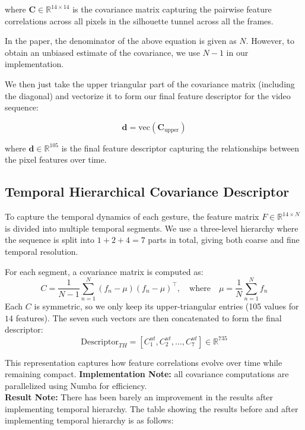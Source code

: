 where $\mathbf{C} \in \mathbb{R}^{14 \times 14}$ is the covariance matrix capturing the pairwise feature correlations across all pixels in the silhouette tunnel across all the frames.



 In the paper, the denominator of the above equation is given as $N$. However, to obtain an unbiased estimate of the covariance, we use $N-1$ in our implementation.

We then just take the upper triangular part of the covariance matrix (including the diagonal) and vectorize it to form our final feature descriptor for the video sequence:

\[
\mathbf{d} = \text{vec}(\mathbf{C}_{\text{upper}})
\]

where $\mathbf{d} \in \mathbb{R}^{105}$ is the final feature descriptor capturing the relationships between the pixel features over time.



\subsection{Temporal Hierarchical Covariance Descriptor}

To capture the temporal dynamics of each gesture, the feature matrix $F \in \mathbb{R}^{14 \times N}$ is divided into multiple temporal segments. 
We use a three-level hierarchy where the sequence is split into $1 + 2 + 4 = 7$ parts in total, giving both coarse and fine temporal resolution.

For each segment, a covariance matrix is computed as:
\[
C = \frac{1}{N - 1} \sum_{n=1}^{N} (f_n - \mu)(f_n - \mu)^{\top},
\quad \text{where} \quad
\mu = \frac{1}{N} \sum_{n=1}^{N} f_n
\]
Each $C$ is symmetric, so we only keep its upper-triangular entries (105 values for $14$ features). 
The seven such vectors are then concatenated to form the final descriptor:
\[
\text{Descriptor}_{TH} = [C_1^{ut}, C_2^{ut}, \ldots, C_7^{ut}] \in \mathbb{R}^{735}
\]

This representation captures how feature correlations evolve over time while remaining compact. 
\textbf{Implementation Note: } all covariance computations are parallelized using Numba for efficiency.\\


\textbf{Result Note:} There has been barely an improvement in the results after implementing temporal hierarchy. The table showing the results before and after implementing temporal hierarchy is as follows:

